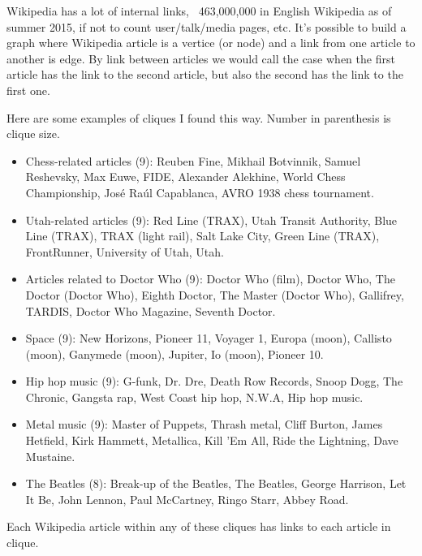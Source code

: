 Wikipedia has a lot of internal links, ~463,000,000 in English Wikipedia as of summer 2015, if not to count user/talk/media pages, etc.
It's possible to build a graph where Wikipedia article is a vertice (or node) and a link from one article to another is edge.
By link between articles we would call the case when the first article has the link to the second article, but also the second has the link to the first one.

Here are some examples of cliques I found this way. Number in parenthesis is clique size.

\begin{itemize}

\item
Chess-related articles (9): Reuben Fine, Mikhail Botvinnik, Samuel Reshevsky, Max Euwe, FIDE, Alexander Alekhine, World Chess Championship, José Raúl Capablanca, AVRO 1938 chess tournament.

\item
Utah-related articles (9): Red Line (TRAX), Utah Transit Authority, Blue Line (TRAX), TRAX (light rail), Salt Lake City, Green Line (TRAX), FrontRunner, University of Utah, Utah.

\item
Articles related to Doctor Who (9): Doctor Who (film), Doctor Who, The Doctor (Doctor Who), Eighth Doctor, The Master (Doctor Who), Gallifrey, TARDIS, Doctor Who Magazine, Seventh Doctor.

\item
Space (9): New Horizons, Pioneer 11, Voyager 1, Europa (moon), Callisto (moon), Ganymede (moon), Jupiter, Io (moon), Pioneer 10.

\item
Hip hop music (9): G-funk, Dr. Dre, Death Row Records, Snoop Dogg, The Chronic, Gangsta rap, West Coast hip hop, N.W.A, Hip hop music.

\item
Metal music (9): Master of Puppets, Thrash metal, Cliff Burton, James Hetfield, Kirk Hammett, Metallica, Kill 'Em All, Ride the Lightning, Dave Mustaine.

\item
The Beatles (8): Break-up of the Beatles, The Beatles, George Harrison, Let It Be, John Lennon, Paul McCartney, Ringo Starr, Abbey Road.

\end{itemize}

Each Wikipedia article within any of these cliques has links to each article in clique.


